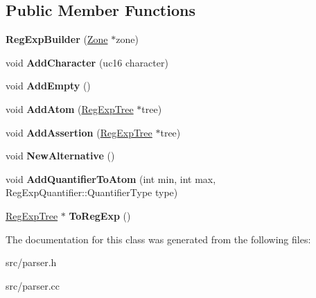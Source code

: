 \subsection*{Public Member Functions}
\begin{DoxyCompactItemize}
\item 
\hypertarget{classv8_1_1internal_1_1_reg_exp_builder_ab1ebc1011cb67f1f08da3bca8aa56406}{}{\bfseries Reg\+Exp\+Builder} (\hyperlink{classv8_1_1internal_1_1_zone}{Zone} $\ast$zone)\label{classv8_1_1internal_1_1_reg_exp_builder_ab1ebc1011cb67f1f08da3bca8aa56406}

\item 
\hypertarget{classv8_1_1internal_1_1_reg_exp_builder_a32147135c6698790960b719446a1fe28}{}void {\bfseries Add\+Character} (uc16 character)\label{classv8_1_1internal_1_1_reg_exp_builder_a32147135c6698790960b719446a1fe28}

\item 
\hypertarget{classv8_1_1internal_1_1_reg_exp_builder_aa1d8f7f7665968635496315908e83400}{}void {\bfseries Add\+Empty} ()\label{classv8_1_1internal_1_1_reg_exp_builder_aa1d8f7f7665968635496315908e83400}

\item 
\hypertarget{classv8_1_1internal_1_1_reg_exp_builder_a48849cf1f137252fa4d49cf682f924c6}{}void {\bfseries Add\+Atom} (\hyperlink{classv8_1_1internal_1_1_reg_exp_tree}{Reg\+Exp\+Tree} $\ast$tree)\label{classv8_1_1internal_1_1_reg_exp_builder_a48849cf1f137252fa4d49cf682f924c6}

\item 
\hypertarget{classv8_1_1internal_1_1_reg_exp_builder_a8c326ad0b05ad72a403a1b7cae303e61}{}void {\bfseries Add\+Assertion} (\hyperlink{classv8_1_1internal_1_1_reg_exp_tree}{Reg\+Exp\+Tree} $\ast$tree)\label{classv8_1_1internal_1_1_reg_exp_builder_a8c326ad0b05ad72a403a1b7cae303e61}

\item 
\hypertarget{classv8_1_1internal_1_1_reg_exp_builder_a36e10f97ed7bf3e79b176374daa6ca61}{}void {\bfseries New\+Alternative} ()\label{classv8_1_1internal_1_1_reg_exp_builder_a36e10f97ed7bf3e79b176374daa6ca61}

\item 
\hypertarget{classv8_1_1internal_1_1_reg_exp_builder_ada58772023b1050cf57eb0576ac182bb}{}void {\bfseries Add\+Quantifier\+To\+Atom} (int min, int max, Reg\+Exp\+Quantifier\+::\+Quantifier\+Type type)\label{classv8_1_1internal_1_1_reg_exp_builder_ada58772023b1050cf57eb0576ac182bb}

\item 
\hypertarget{classv8_1_1internal_1_1_reg_exp_builder_aeba1037a385f30fdb37eac9f89b2671e}{}\hyperlink{classv8_1_1internal_1_1_reg_exp_tree}{Reg\+Exp\+Tree} $\ast$ {\bfseries To\+Reg\+Exp} ()\label{classv8_1_1internal_1_1_reg_exp_builder_aeba1037a385f30fdb37eac9f89b2671e}

\end{DoxyCompactItemize}


The documentation for this class was generated from the following files\+:\begin{DoxyCompactItemize}
\item 
src/parser.\+h\item 
src/parser.\+cc\end{DoxyCompactItemize}
